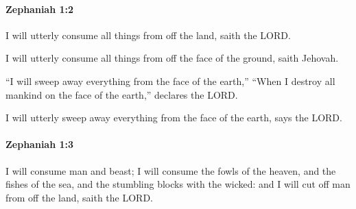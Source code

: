 		\paragraph{Zephaniah 1:2} %
			\label{ZEPHANIAH-1-2}

			I will utterly consume all things from off the land, saith the LORD.

			\begin{versebox}
					\item[BHS] 
					\item[LXX] 
					\item[ASV] I will utterly consume all things from off the face of the ground, saith Jehovah.
					\item[NIV] “I will sweep away everything from the face of the earth,” “When I destroy all mankind on the face of the earth,” declares the LORD.
					\item[NRSV] I will utterly sweep away everything from the face of the earth, says the LORD.
			\end{versebox}

		\paragraph{Zephaniah 1:3} %
			\label{ZEPHANIAH-1-3}

			I will consume man and beast; I will consume the fowls of the heaven, and the fishes of the sea, and the stumbling blocks with the wicked: and I will cut off man from off the land, saith the LORD.

